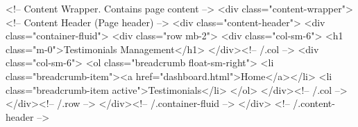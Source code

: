     <!-- Content Wrapper. Contains page content -->
    <div class="content-wrapper">
        <!-- Content Header (Page header) -->
        <div class="content-header">
            <div class="container-fluid">
                <div class="row mb-2">
                    <div class="col-sm-6">
                        <h1 class="m-0">Testimonials Management</h1>
                    </div><!-- /.col -->
                    <div class="col-sm-6">
                        <ol class="breadcrumb float-sm-right">
                            <li class="breadcrumb-item"><a href="dashboard.html">Home</a></li>
                            <li class="breadcrumb-item active">Testimonials</li>
                        </ol>
                    </div><!-- /.col -->
                </div><!-- /.row -->
            </div><!-- /.container-fluid -->
        </div>
        <!-- /.content-header -->

